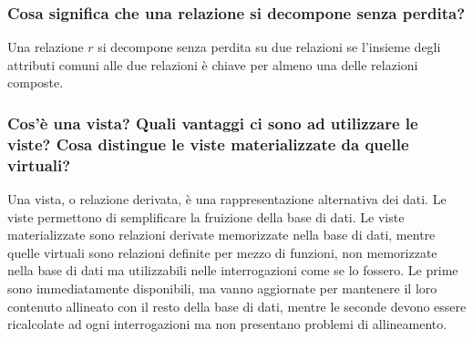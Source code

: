 \documentclass[11pt]{article}
\begin{document}
\subsubsection*{Cosa significa che una relazione si decompone senza perdita?}
Una relazione $r$ si decompone senza perdita su due relazioni se l'insieme degli attributi comuni alle due relazioni è 
chiave per almeno una delle relazioni composte.
\subsubsection*{Cos'è una vista? Quali vantaggi ci sono ad utilizzare le viste? Cosa distingue le viste materializzate 
da quelle virtuali?}
Una vista, o relazione derivata, è una rappresentazione alternativa dei dati. Le viste permettono di semplificare la 
fruizione della base di dati. 
Le viste materializzate sono relazioni derivate memorizzate nella base di dati, mentre quelle virtuali sono relazioni 
definite per mezzo di funzioni, non memorizzate nella base di dati ma utilizzabili nelle interrogazioni come se lo fossero.
Le prime sono immediatamente disponibili, ma vanno aggiornate per mantenere il loro contenuto allineato con il resto della 
base di dati, mentre le seconde devono essere ricalcolate ad ogni interrogazioni ma non presentano problemi di allineamento.
\end{document}

